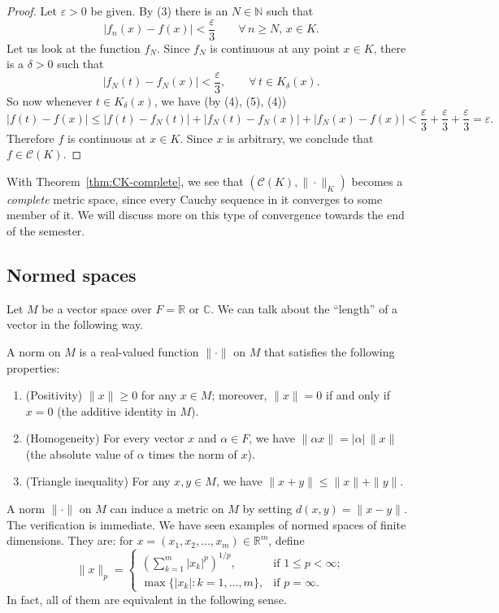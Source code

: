 \begin{proof}
  Let $\varepsilon > 0$ be given.
  By (3) there is an $N \in \mathbb N$ such that
  \[
    \tag{4}
    |f_n(x) - f(x)| < \frac{\varepsilon}{3} \qquad \forall \, n \geqslant N, \, x \in K.
  \]
  Let us look at the function $f_N$.
  Since $f_N$ is continuous at any point $x \in K$, there is a $\delta > 0$ such that
  \[
    \tag{5}
    |f_N(t) - f_N(x)| < \frac{\varepsilon}{3}, \qquad \forall \, t \in K_\delta(x).
  \]
  So now whenever $t \in K_\delta(x)$, we have (by (4), (5), (4))
  \[
    |f(t) - f(x)| \leqslant |f(t) - f_N(t)| + |f_N(t) - f_N(x)| + |f_N(x) - f(x)| 
    < \frac{\varepsilon}{3} + \frac{\varepsilon}{3} + \frac{\varepsilon}{3} = \varepsilon.
  \]
  Therefore $f$ is continuous at $x \in K$.
  Since $x$ is arbitrary, we conclude that $f \in \mathcal{C}(K)$.
\end{proof}

With Theorem~\ref{thm:CK-complete}, we see that $(\mathcal{C}(K), \| \cdot \|_K)$ becomes a \textit{complete} metric space, since every Cauchy sequence in it converges to some member of it.
We will discuss more on this type of convergence towards the end of the semester.

\subsection{Normed spaces}

Let $M$ be a vector space over $F = \mathbb{R}$ or $\mathbb{C}$.
We can talk about the ``length'' of a vector in the following way.

\begin{defn}
  A \textsf{norm} on $M$ is a real-valued function $\| \cdot \|$ on $M$ that satisfies the following properties:
  \begin{enumerate}[(1)]
    \item (Positivity) $\| x \| \geqslant 0$ for any $x \in M$; moreover, $\| x \| = 0$ if and only if $x = 0$ (the additive identity in $M$).
    \item (Homogeneity) For every vector $x$ and $\alpha \in F$, we have $\| \alpha x \| = | \alpha | \, \| x \|$ (the absolute value of $\alpha$ times the norm of $x$).
    \item (Triangle inequality) For any $x, y \in M$, we have $\| x + y \| \leqslant \| x \| + \| y \|$.
  \end{enumerate}
\end{defn}

A norm $\| \cdot \|$ on $M$ can induce a metric on $M$ by setting $d(x,y) = \| x - y \|$.
The verification is immediate.
We have seen examples of normed spaces of finite dimensions.
They are: for $x = (x_1, x_2, \dots, x_m) \in \mathbb{R}^m$, define
\[
  \| x \|_p = \begin{cases}
    \left( \sum_{k=1}^m |x_k|^p \right)^{1/p}, & \text{if $1 \leqslant p < \infty$}; \\
    \max \{ |x_k| \colon k = 1, \dots, m \}, & \text{if $p = \infty$.}
  \end{cases}
\]
In fact, all of them are equivalent in the following sense.


